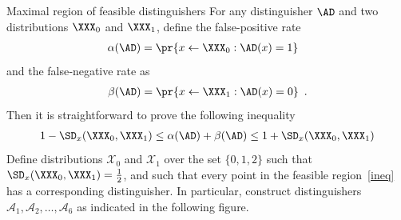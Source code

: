 \documentclass{crypto-exercise}
\author{Sven Laur}
\begin{document}
\begin{exercise}{Maximal region of feasible distinguishers}
For any distinguisher $\AD$ and two distributions $\XXX_0$ and $\XXX_1$, define the false-positive rate
\begin{align*}
\alpha(\AD)=\pr{x\gets\XXX_0: \AD(x)=1}\enspace\phantom{.}
\end{align*}
and the false‑negative rate as
\begin{align*}
\beta(\AD)=\pr{x\gets\XXX_1: \AD(x)=0}\enspace.
\end{align*}
Then it is straightforward to prove the following inequality 
\begin{align}\label{ineq}
1-\SD_x(\XXX_0,\XXX_1)\leq \alpha(\AD) +\beta(\AD)\leq 1+\SD_x(\XXX_0,\XXX_1)
\end{align}
Define distributions $\mathcal{X}_0$ and $\mathcal{X}_1$ over the set $\{0,1,2\}$ such that $\SD_x(\XXX_0,\XXX_1)=\tfrac{1}{2}$, and such that every point in the feasible region~\eqref{ineq} has a corresponding distinguisher. In particular, construct distinguishers $\mathcal{A}_1, \mathcal{A}_2,\ldots, \mathcal{A}_6$ as indicated in the following figure. 
\begin{center}
\end{center}



\end{exercise}


\begin{solution}
\end{solution}
\end{document}
